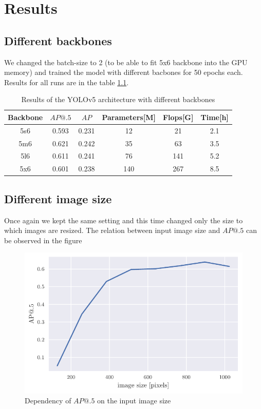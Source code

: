 \chapter{Results}

\section{Different backbones}
We changed the batch-size to 2 (to be able to fit 5x6 backbone into the GPU memory) and trained the model with different bacbones for 50 epochs each. Results for all runs are in the table \ref{tab:yolov5_backbones}.

\begin{table}
    \begin{tabular}{c|c|c|c|c|c}
        Backbone & $AP@.5$ & $AP$  & Parameters[M] & Flops[G] & Time[h] \\ \hline
        5s6      & 0.593   & 0.231 & 12            & 21       & 2.1     \\ \hline
        5m6      & 0.621   & 0.242 & 35            & 63       & 3.5     \\ \hline
        5l6      & 0.611   & 0.241 & 76            & 141      & 5.2     \\ \hline
        5x6      & 0.601   & 0.238 & 140           & 267      & 8.5     \\
    \end{tabular}
    \caption{Results of the YOLOv5 architecture with different backbones}
    \label{tab:yolov5_backbones}
\end{table}

\section{Different image size}
Once again we kept the same setting and this time changed only the size to which images are resized. The relation between input image size and $AP@.5$ can be observed in the figure

\begin{figure}
    \includegraphics[width=\linewidth]{images/img_size_dependency.pdf}
    \caption{Dependency of $AP@.5$ on the input image size}
\end{figure}

